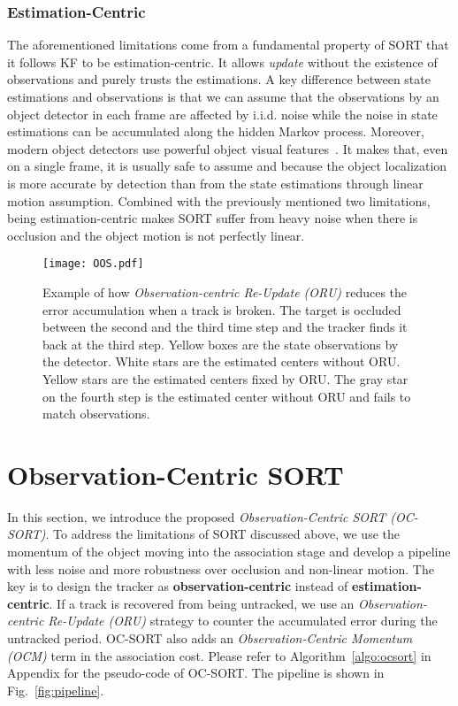\documentclass[10pt,twocolumn,letterpaper]{article}
\begin{document}
\vspace{-0.5cm}
\subsubsection{Estimation-Centric}
\vspace{-0.2cm}
The aforementioned limitations come from a fundamental property of SORT that it follows KF to be estimation-centric. 
It allows \textit{update} without the existence of observations and purely trusts the estimations. A key difference between state estimations and observations is that we can assume that the observations by an object detector in each frame are affected by i.i.d. noise  while the noise in state estimations can be accumulated along the hidden Markov process.
Moreover, modern object detectors use powerful object visual features~\cite{vgg,ren2015faster}. It makes that, even on a single frame, it is usually safe to assume  and  because the object localization is more accurate by detection than from the state estimations through linear motion assumption. Combined with the previously mentioned two limitations, being estimation-centric makes SORT suffer from heavy noise when there is occlusion and the object motion is not perfectly linear.



\begin{figure*}[t]
\setlength{\abovecaptionskip}{0.1cm}
    \centering
    \texttt{[image: OOS.pdf]}
    \caption{Example of how \textit{Observation-centric Re-Update (ORU)} reduces the error accumulation when a track is broken. The target is occluded between the second and the third time step and the tracker finds it back at the third step. Yellow boxes are the state observations by the detector. White stars are the estimated centers without ORU. Yellow stars are the estimated centers fixed by ORU. The gray star on the fourth step is the estimated center without ORU and fails to match observations. }
    \label{fig:oos}
    \vspace{-0.3cm}
\end{figure*}

\section{Observation-Centric SORT}
\label{sec:method}
In this section, we introduce the proposed \textit{Observation-Centric SORT (OC-SORT)}. To address the limitations of SORT discussed above, we use the momentum of the object moving into the association stage and develop a pipeline with less noise and more robustness over occlusion and non-linear motion. The key is to design the tracker as \textbf{observation-centric} instead of \textbf{estimation-centric}.
If a track is recovered from being untracked, we use an \textit{Observation-centric Re-Update (ORU)} strategy to counter the accumulated error during the untracked period. 
OC-SORT also adds an \textit{Observation-Centric Momentum (OCM)} term in the association cost. 
Please refer to Algorithm~\ref{algo:ocsort} in Appendix for the pseudo-code of OC-SORT. The pipeline is shown in Fig.~\ref{fig:pipeline}.
\end{document}
